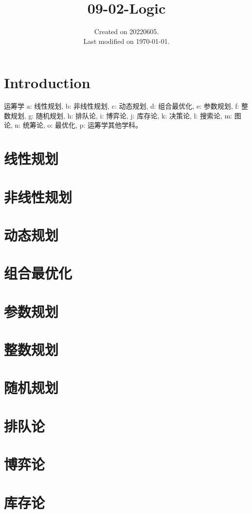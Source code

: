 \documentclass[UTF8]{../09-Mathematics}
\begin{document}
\title{09-02-Logic}
\date{Created on 20220605.\\   Last modified on \today.}
\maketitle
\tableofcontents


\chapter{Introduction}



运筹学
a: 线性规划, 
b: 非线性规划, 
c: 动态规划, 
d: 组合最优化, 
e: 参数规划, 
f: 整数规划, 
g: 随机规划, 
h: 排队论, 
i: 博弈论, 
j: 库存论, 
k: 决策论, 
l: 搜索论, 
m: 图论, 
n: 统筹论, 
o: 最优化, 
p: 运筹学其他学科。

\chapter{线性规划}
\chapter{非线性规划}
\chapter{动态规划}
\chapter{组合最优化}
\chapter{参数规划}
\chapter{整数规划}
\chapter{随机规划}
\chapter{排队论}
\chapter{博弈论}
\chapter{库存论}
\end{document}
